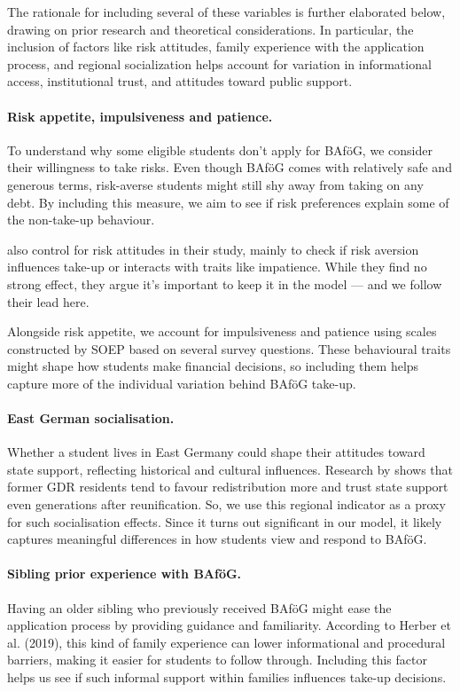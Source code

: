 The rationale for including several of these variables is further elaborated below, drawing on prior research and theoretical considerations. In particular, the inclusion of factors like risk attitudes, family experience with the application process, and regional socialization helps account for variation in informational access, institutional trust, and attitudes toward public support.

\paragraph{Risk appetite, impulsiveness and patience.}  
To understand why some eligible students don’t apply for BAföG, we consider their willingness to take risks.  
Even though BAföG comes with relatively safe and generous terms, risk-averse students might still shy away from taking on any debt.  
By including this measure, we aim to see if risk preferences explain some of the non-take-up behaviour.  

\cite{herber_non-take-up_2019} also control for risk attitudes in their study, mainly to check if risk aversion influences take-up or interacts with traits like impatience.  
While they find no strong effect, they argue it’s important to keep it in the model — and we follow their lead here.  

Alongside risk appetite, we account for impulsiveness and patience using scales constructed by SOEP based on several survey questions.  
These behavioural traits might shape how students make financial decisions, so including them helps capture more of the individual variation behind BAföG take-up.

\paragraph{East German socialisation.}  
Whether a student lives in East Germany could shape their attitudes toward state support, reflecting historical and cultural influences.  
Research by \cite{alesina_good-bye_2007} shows that former GDR residents tend to favour redistribution more and trust state support even generations after reunification.  
So, we use this regional indicator as a proxy for such socialisation effects.  
Since it turns out significant in our model, it likely captures meaningful differences in how students view and respond to BAföG.

\paragraph{Sibling prior experience with BAföG.}  
Having an older sibling who previously received BAföG might ease the application process by providing guidance and familiarity.  
According to Herber et al. (2019), this kind of family experience can lower informational and procedural barriers, making it easier for students to follow through.  
Including this factor helps us see if such informal support within families influences take-up decisions.


